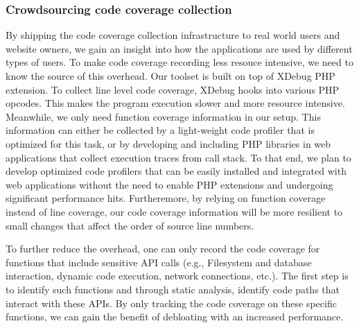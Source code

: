 \subsubsection{Crowdsourcing code coverage collection}
By shipping the code coverage collection infrastructure to real world users and website owners, we gain an insight into how the applications are used by different types of users. To make code coverage recording less resouce intensive, we need to know the source of this overhead.
Our toolset is built on top of XDebug PHP extension. To collect line level code coverage, XDebug hooks into various PHP opcodes. This makes the program execution slower and more resource intensive. Meanwhile, we only need function coverage information in our setup. This information can either be collected by a light-weight code profiler that is optimized for this task, or by developing and including PHP libraries in web applications that collect execution traces from call stack. To that end, we plan to develop optimized code profilers that can be easily installed and integrated with web applications without the need to enable PHP extensions and undergoing significant performance hits. Furtheremore, by relying on function coverage instead of line coverage, our code coverage information will be more resilient to small changes that affect the order of source line numbers.

To further reduce the overhead, one can only record the code coverage for functions that include sensitive API calls (e.g., Filesystem and database interaction, dynamic code execution, network connections, etc.). The first step is to identify such functions and through static analysis, identify code paths that interact with these APIs. By only tracking the code coverage on these specific functions, we can gain the benefit of debloating with an increased performance.
